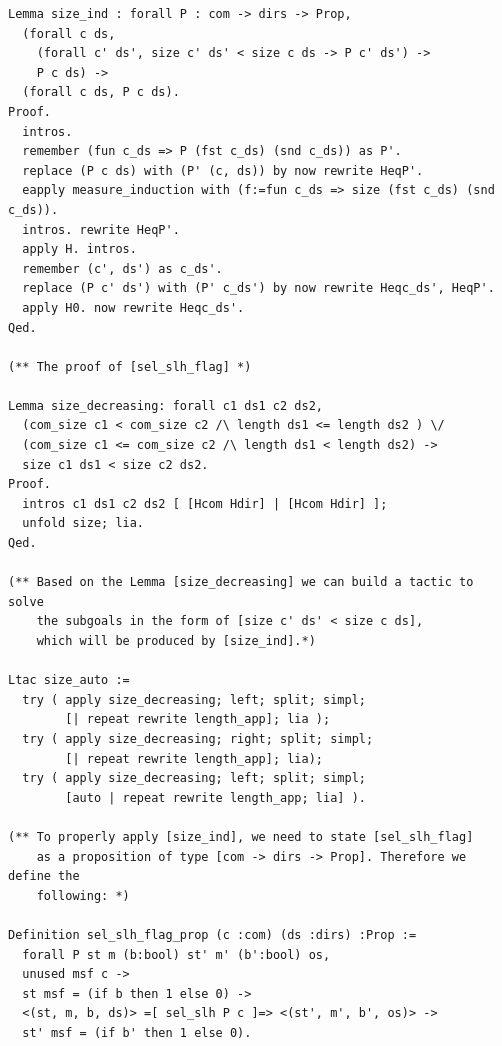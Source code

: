 \documentclass[12pt]{report}
\begin{document}
\begin{verbatim}
Lemma size_ind : forall P : com -> dirs -> Prop,
  (forall c ds,
    (forall c' ds', size c' ds' < size c ds -> P c' ds') ->
    P c ds) ->
  (forall c ds, P c ds).
Proof.
  intros.
  remember (fun c_ds => P (fst c_ds) (snd c_ds)) as P'.
  replace (P c ds) with (P' (c, ds)) by now rewrite HeqP'.
  eapply measure_induction with (f:=fun c_ds => size (fst c_ds) (snd c_ds)).
  intros. rewrite HeqP'.
  apply H. intros.
  remember (c', ds') as c_ds'.
  replace (P c' ds') with (P' c_ds') by now rewrite Heqc_ds', HeqP'.
  apply H0. now rewrite Heqc_ds'.
Qed.

(** The proof of [sel_slh_flag] *)

Lemma size_decreasing: forall c1 ds1 c2 ds2,
  (com_size c1 < com_size c2 /\ length ds1 <= length ds2 ) \/
  (com_size c1 <= com_size c2 /\ length ds1 < length ds2) ->
  size c1 ds1 < size c2 ds2.
Proof.
  intros c1 ds1 c2 ds2 [ [Hcom Hdir] | [Hcom Hdir] ];
  unfold size; lia.
Qed.

(** Based on the Lemma [size_decreasing] we can build a tactic to solve
    the subgoals in the form of [size c' ds' < size c ds],
    which will be produced by [size_ind].*)

Ltac size_auto :=
  try ( apply size_decreasing; left; split; simpl;
        [| repeat rewrite length_app]; lia );
  try ( apply size_decreasing; right; split; simpl;
        [| repeat rewrite length_app]; lia);
  try ( apply size_decreasing; left; split; simpl;
        [auto | repeat rewrite length_app; lia] ).

(** To properly apply [size_ind], we need to state [sel_slh_flag]
    as a proposition of type [com -> dirs -> Prop]. Therefore we define the
    following: *)

Definition sel_slh_flag_prop (c :com) (ds :dirs) :Prop :=
  forall P st m (b:bool) st' m' (b':bool) os,
  unused msf c ->
  st msf = (if b then 1 else 0) ->
  <(st, m, b, ds)> =[ sel_slh P c ]=> <(st', m', b', os)> ->
  st' msf = (if b' then 1 else 0).


\end{verbatim}
\end{document}
